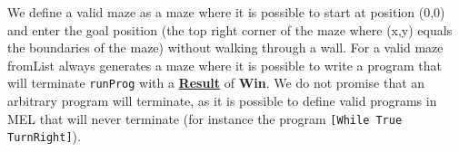 \documentclass{article}
\newcommand{\haskell}[1]{\texttt{#1}}
\newcommand{\datatype}[1]{\underline{\textbf{#1}}}
\newcommand{\direction}[1]{\textbf{#1}}
\begin{document}
We define a valid maze as a maze where it is possible to start at position (0,0) and enter the goal position (the top right corner of the maze where (x,y) equals the boundaries of the maze) without walking through a wall.
For a valid maze fromList always generates a maze where it is possible to write a program that will terminate \haskell{runProg} with a \datatype{Result} of \direction{Win}.
We do not promise that an arbitrary program will terminate, as it is possible to define valid programs in MEL that will never terminate (for instance the program \haskell{[While True TurnRight]}).
\end{document}

